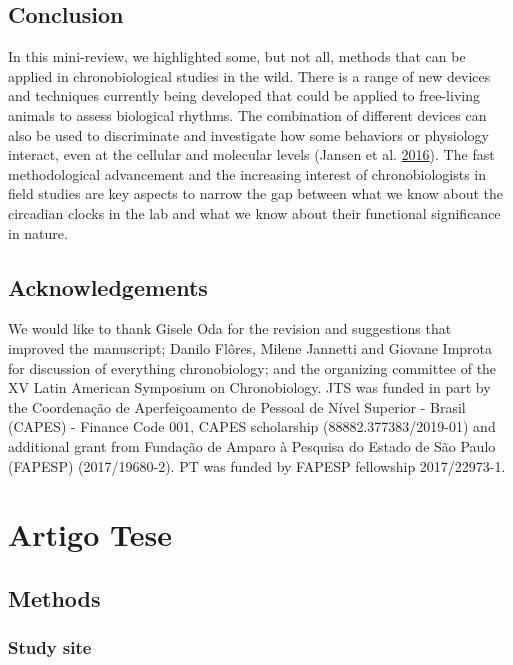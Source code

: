 \documentclass[msc,numbers,hidelinks]{coppe}
\begin{document}
  \hypertarget{conclusion}{%
  \section{Conclusion}\label{conclusion}}

  In this mini-review, we highlighted some, but not all, methods that can be applied in chronobiological studies in the wild. There is a range of new devices and techniques currently being developed that could be applied to free-living animals to assess biological rhythms. The combination of different devices can also be used to discriminate and investigate how some behaviors or physiology interact, even at the cellular and molecular levels (Jansen et al. \protect\hyperlink{ref-jansenBearCircadianClock2016}{2016}). The fast methodological advancement and the increasing interest of chronobiologists in field studies are key aspects to narrow the gap between what we know about the circadian clocks in the lab and what we know about their functional significance in nature.

  \hypertarget{acknowledgements}{%
  \section{Acknowledgements}\label{acknowledgements}}

  We would like to thank Gisele Oda for the revision and suggestions that improved the manuscript; Danilo Flôres, Milene Jannetti and Giovane Improta for discussion of everything chronobiology; and the organizing committee of the XV Latin American Symposium on Chronobiology. JTS was funded in part by the Coordenação de Aperfeiçoamento de Pessoal de Nível Superior - Brasil (CAPES) - Finance Code 001, CAPES scholarship (88882.377383/2019-01) and additional grant from Fundação de Amparo à Pesquisa do Estado de São Paulo (FAPESP) (2017/19680-2). PT was funded by FAPESP fellowship 2017/22973-1.

  \hypertarget{artigo-tese}{%
  \chapter{Artigo Tese}\label{artigo-tese}}

  \hypertarget{methods}{%
  \section{Methods}\label{methods}}

  \hypertarget{study-site}{%
  \subsection{Study site}\label{study-site}}
\end{document}

